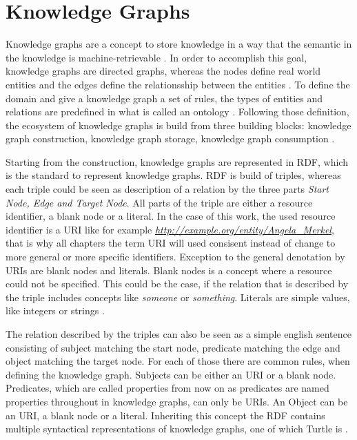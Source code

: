 \documentclass[a4paper,oneside,bibliography=totoc]{scrbook}
\begin{document}
\section{Knowledge Graphs}
\label{sec:knowledge_graphs}
Knowledge graphs are a concept to store knowledge in a way that the semantic in the knowledge is machine-retrievable \cite{GomezPerez2017}. In order to accomplish this goal, knowledge graphs are directed graphs, whereas the nodes define real world entities and the edges define the relationsship between the entities \cite{Paulheim2016}. To define the domain and give a knowledge graph a set of rules, the types of entities and relations are predefined in what is called an ontology \cite{GomezPerez2017,Paulheim2016}. Following those definition, the ecosystem of knowledge graphs is build from three building blocks: knowledge graph construction, knowledge graph storage, knowledge graph consumption \cite{GomezPerez2017}.

Starting from the construction, knowledge graphs are represented in \ac{RDF}, which is the standard to represent knowledge graphs. \ac{RDF} is build of triples, whereas each triple could be seen as description of a relation by the three parts \textit{Start Node, Edge and Target Node}. All parts of the triple are either a resource identifier, a blank node or a literal. In the case of this work, the used resource identifier is a \ac{URI} like for example \textit{\url{http://example.org/entity/Angela_Merkel}}, that is why all chapters the term \ac{URI} will used consisent instead of change to more general or more specific identifiers. Exception to the general denotation by \acp{URI} are blank nodes and literals. Blank nodes is a concept where a resource could not be specified. This could be the case, if the relation that is described by the triple includes concepts like \textit{someone} or \textit{something}. Literals are simple values, like integers or strings \cite{VillazonTerrazas2017}.

The relation described by the triples can also be seen as a simple english sentence consisting of subject matching the start node, predicate matching the edge and object matching the target node. For each of those there are common rules, when defining the knowledge graph. Subjects can be either an \ac{URI} or a blank node. Predicates, which are called properties from now on as predicates are named properties throughout in knowledge graphs, can only be \acp{URI}. An Object can be an \ac{URI}, a blank node or a literal. Inheriting this concept the \ac{RDF} contains multiple syntactical representations of knowledge graphs, one of which Turtle is \cite{VillazonTerrazas2017}.
\end{document}
